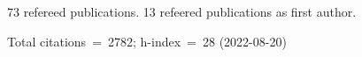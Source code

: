 73 refereed publications. 13 refeered publications as first author.

Total citations~=~2782; h-index~=~28 (2022-08-20)